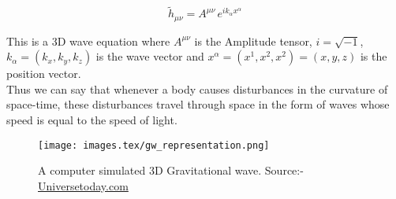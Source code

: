  \begin{equation}
     \tilde{h}_{\mu\nu} = A^{\mu\nu}\, e^{ik_{\alpha}x^{\alpha}}
 \end{equation}
 
 \noindent This is a 3D wave equation where $A^{\mu\nu}$ is the Amplitude tensor, $i = \sqrt{-1} $, $k_{\alpha} = (k_{x},k_{y},k_{z})$ is the wave vector and $x^{\alpha} = (x^{1},x^{2},x^{2}) = (x,y,z)$ is the position vector.
 \\
 
 Thus we can say that whenever a body causes disturbances in the curvature of space-time, these disturbances travel through space in the form of waves whose speed is equal to the speed of light.  
 
\begin{figure}[h]
     \centering
     \texttt{[image: images.tex/gw\_representation.png]}
     \caption{A computer simulated 3D Gravitational wave. Source:- \href{https://www.universetoday.com/127255/gravitational-waves-101/}{Universetoday.com}}
 \end{figure}

\pagebreak
